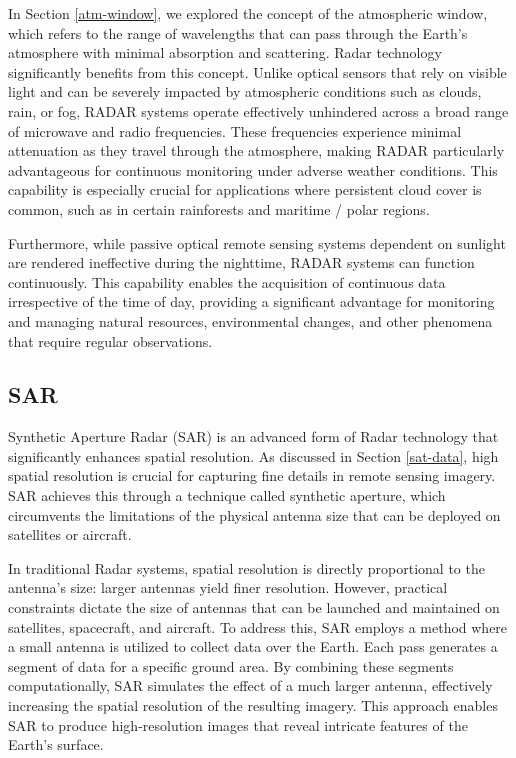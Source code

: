 \documentclass[
  12 pt,
]{Nemilov}
\begin{document}
In Section \ref{atm-window}, we explored the concept of the atmospheric window, which refers to the range of wavelengths that can pass through the Earth's atmosphere with minimal absorption and scattering. Radar technology significantly benefits from this concept. Unlike optical sensors that rely on visible light and can be severely impacted by atmospheric conditions such as clouds, rain, or fog, RADAR systems operate effectively unhindered across a broad range of microwave and radio frequencies. These frequencies experience minimal attenuation as they travel through the atmosphere, making RADAR particularly advantageous for continuous monitoring under adverse weather conditions. This capability is especially crucial for applications where persistent cloud cover is common, such as in certain rainforests and maritime / polar regions.

Furthermore, while passive optical remote sensing systems dependent on sunlight are rendered ineffective during the nighttime, RADAR systems can function continuously. This capability enables the acquisition of continuous data irrespective of the time of day, providing a significant advantage for monitoring and managing natural resources, environmental changes, and other phenomena that require regular observations.

\subsection{SAR}\label{sar}

Synthetic Aperture Radar (SAR) is an advanced form of Radar technology that significantly enhances spatial resolution. As discussed in Section \ref{sat-data}, high spatial resolution is crucial for capturing fine details in remote sensing imagery. SAR achieves this through a technique called synthetic aperture, which circumvents the limitations of the physical antenna size that can be deployed on satellites or aircraft.

In traditional Radar systems, spatial resolution is directly proportional to the antenna's size: larger antennas yield finer resolution. However, practical constraints dictate the size of antennas that can be launched and maintained on satellites, spacecraft, and aircraft. To address this, SAR employs a method where a small antenna is utilized to collect data over the Earth. Each pass generates a segment of data for a specific ground area. By combining these segments computationally, SAR simulates the effect of a much larger antenna, effectively increasing the spatial resolution of the resulting imagery. This approach enables SAR to produce high-resolution images that reveal intricate features of the Earth's surface.
\end{document}
